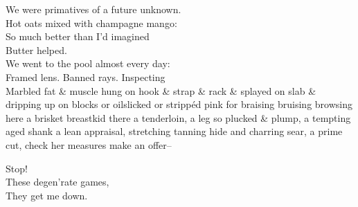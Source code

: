 We were primatives of a future unknown. \\
Hot oats mixed with champagne mango: \\
So much better than I'd imagined \\

Butter helped. \\
We went to the pool almost every day: \\
Framed lens. Banned rays. Inspecting \\
Marbled fat \& muscle hung on hook \& strap \& rack \& splayed on slab \& dripping up on blocks or oilslicked or strippéd pink for braising bruising browsing here a brisket breastkid there a tenderloin, a leg so plucked \& plump, a tempting aged shank a lean appraisal, stretching tanning hide and charring sear, a prime cut, check her measures make an offer--

Stop! \\
These degen'rate games, \\
They get me down. \\
